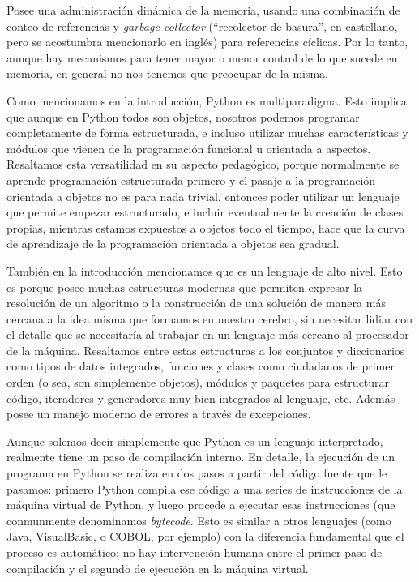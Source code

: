 Posee una administración dinámica de la memoria, usando una combinación de conteo de referencias y \textit{garbage collector} (``recolector de basura'', en castellano, pero se acostumbra mencionarlo en inglés) para referencias cíclicas. Por lo tanto, aunque hay mecanismos para tener mayor o menor control de lo que sucede en memoria, en general no nos tenemos que preocupar de la misma.

Como mencionamos en la introducción, Python es multiparadigma. Esto implica que aunque en Python todos son objetos, nosotros podemos programar completamente de forma estructurada, e incluso utilizar muchas características y módulos que vienen de la programación funcional u orientada a aspectos. Resaltamos esta versatilidad en su aspecto pedagógico, porque normalmente se aprende programación estructurada primero y el pasaje a la programación orientada a objetos no es para nada trivial, entonces poder utilizar un lenguaje que permite empezar estructurado, e incluir eventualmente la creación de clases propias, mientras estamos expuestos a objetos todo el tiempo, hace que la curva de aprendizaje de la programación orientada a objetos sea gradual.

También en la introducción mencionamos que es un lenguaje de alto nivel. Esto es porque posee muchas estructuras modernas que permiten expresar la resolución de un algoritmo o la construcción de una solución de manera más cercana a la idea misma que formamos en nuestro cerebro, sin necesitar lidiar con el detalle que se necesitaría al trabajar en un lenguaje más cercano al procesador de la máquina. Resaltamos entre estas estructuras a los conjuntos y diccionarios como tipos de datos integrados, funciones y clases como ciudadanos de primer orden (o sea, son simplemente objetos), módulos y paquetes para estructurar código, iteradores y generadores muy bien integrados al lenguaje, etc. Además posee un manejo moderno de errores a través de excepciones.

Aunque solemos decir simplemente que Python es un lenguaje interpretado, realmente tiene un paso de compilación interno. En detalle, la ejecución de un programa en Python se realiza en dos pasos a partir del código fuente que le pasamos: primero Python compila ese código a una series de instrucciones de la máquina virtual de Python, y luego procede a ejecutar esas instrucciones (que conmunmente denominamos \textit{bytecode}. Esto es similar a otros lenguajes (como Java, VisualBasic, o COBOL, por ejemplo) con la diferencia fundamental que el proceso es automático: no hay intervención humana entre el primer paso de compilación y el segundo de ejecución en la máquina virtual.

